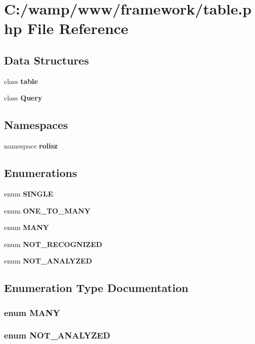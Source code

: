 \section{C:/wamp/www/framework/table.php File Reference}
\label{table_8php}
\subsection*{Data Structures}
\begin{DoxyCompactItemize}
\item 
class {\bf table}
\item 
class {\bf Query}
\end{DoxyCompactItemize}
\subsection*{Namespaces}
\begin{DoxyCompactItemize}
\item 
namespace {\bf rolisz}
\end{DoxyCompactItemize}
\subsection*{Enumerations}
\begin{DoxyCompactItemize}
\item 
enum {\bf SINGLE} 
\item 
enum {\bf ONE\_\-TO\_\-MANY} 
\item 
enum {\bf MANY} 
\item 
enum {\bf NOT\_\-RECOGNIZED} 
\item 
enum {\bf NOT\_\-ANALYZED} 
\end{DoxyCompactItemize}


\subsection{Enumeration Type Documentation}
\subsubsection[{MANY}]{\setlength{\rightskip}{0pt plus 5cm}enum {\bf MANY}}\label{table_8php_a0146ef09f9a37e6ec7dbd719390f9de4}
\subsubsection[{NOT\_\-ANALYZED}]{\setlength{\rightskip}{0pt plus 5cm}enum {\bf NOT\_\-ANALYZED}}\label{table_8php_ab2ccf7b117b4b822d61c1a3a07a528a2}

